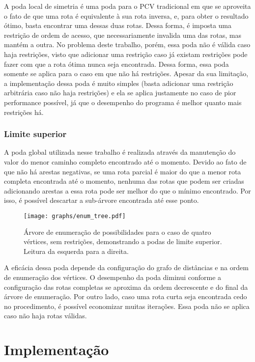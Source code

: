 \documentclass[10pt,a4paper]{article}
\numberwithin{equation}{section}
\begin{document}
A poda local de simetria é uma poda para o PCV tradicional em que se aproveita o fato de que uma rota é equivalente à sua rota inversa, e, para obter o resultado ótimo, basta encontrar uma dessas duas rotas. Dessa forma, é imposta uma restrição de ordem de acesso, que necessariamente invalida uma das rotas, mas mantém a outra. No problema deste trabalho, porém, essa poda não é válida caso haja restrições, visto que adicionar uma restrição caso já existam restrições pode fazer com que a rota ótima nunca seja encontrada. Dessa forma, essa poda somente se aplica para o caso em que não há restrições. Apesar da sua limitação, a implementação dessa poda é muito simples (basta adicionar uma restrição arbitrária caso não haja restrições) e ela se aplica justamente no caso de pior performance possível, já que o desempenho do programa é melhor quanto mais restrições há.

\subsubsection{Limite superior}

A poda global utilizada nesse trabalho é realizada através da manutenção do valor do menor caminho completo encontrado até o momento. Devido ao fato de que não há arestas negativas, se uma rota parcial é maior do que a menor rota completa encontrada até o momento, nenhuma das rotas que podem ser criadas adicionando arestas a essa rota pode ser melhor do que o mínimo encontrado. Por isso, é possível descartar a sub-árvore encontrada até esse ponto.

\begin{figure}[H]
    \centering
    \texttt{[image: graphs/enum\_tree.pdf]}
    \caption{Árvore de enumeração de possibilidades para o caso de quatro vértices, sem restrições, demonstrando a podas de limite superior. Leitura da esquerda para a direita.}
    \label{fig:limsup}
\end{figure}

A eficácia dessa poda depende da configuração do grafo de distâncias e na ordem de enumeração dos vértices. O desempenho da poda diminui conforme a configuração das rotas completas se aproxima da ordem decrescente e do final da árvore de enumeração. Por outro lado, caso uma rota curta seja encontrada cedo no procedimento, é possível economizar muitas iterações. Essa poda não se aplica caso não haja rotas válidas.

\section{Implementação}
\end{document}
